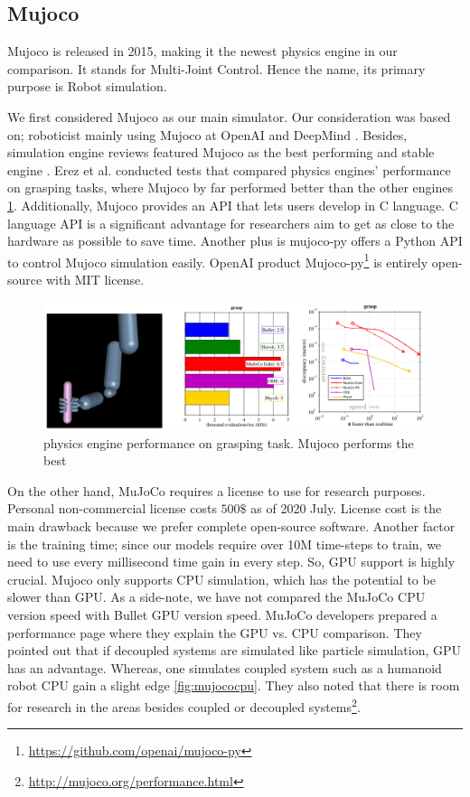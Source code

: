 \subsection{Mujoco}

Mujoco is released in 2015, making it the newest physics engine in our comparison. It stands for Multi-Joint Control. Hence the name, its primary purpose is Robot simulation.
 
We first considered Mujoco as our main simulator. Our consideration was based on; roboticist mainly using Mujoco at OpenAI and DeepMind \cite{OpenAIgym}. Besides, simulation engine reviews featured Mujoco as the best performing and stable engine \cite{Erez2015}. Erez et al. conducted tests that compared physics engines' performance on grasping tasks, where Mujoco by far performed better than the other engines \ref{fig:handmujoco}. Additionally, Mujoco provides an API that lets users develop in C language. C language API is a significant advantage for researchers aim to get as close to the hardware as possible to save time. Another plus is mujoco-py offers a Python API to control Mujoco simulation easily. OpenAI product Mujoco-py\footnote{\url{https://github.com/openai/mujoco-py}} is entirely open-source with MIT license. 

\begin{figure}[htbp]
    \centering
      \includegraphics[width=1.0\textwidth]{figures/MujocoHand}
    \caption{physics engine performance on grasping task. Mujoco performs the best \cite{Erez2015}}
    \label{fig:handmujoco}
\end{figure}


On the other hand, MuJoCo requires a license to use for research purposes. Personal non-commercial license costs \(500\$\) as of 2020 July. License cost is the main drawback because we prefer complete open-source software. Another factor is the training time; since our models require over 10M time-steps to train, we need to use every millisecond time gain in every step. So, GPU support is highly crucial. Mujoco only supports CPU simulation, which has the potential to be slower than GPU. As a side-note, we have not compared the MuJoCo CPU version speed with Bullet GPU version speed. MuJoCo developers prepared a performance page where they explain the GPU vs. CPU comparison. They pointed out that if decoupled systems are simulated like particle simulation, GPU has an advantage. Whereas, one simulates coupled system such as a humanoid robot CPU gain a slight edge \ref{fig:mujococpu}. They also noted that there is room for research in the areas besides coupled or decoupled systems\footnote{\url{http://mujoco.org/performance.html}}.


